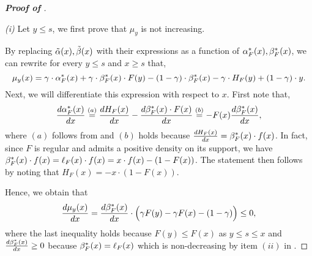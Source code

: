 \begin{proof}[\textbf{Proof of }]

\,

\noindent \textit{(i)} Let $y \leq s$, we first prove that $\mu_y$ is not increasing.

By replacing  $\tilde{\alpha}(x),\tilde{\beta}(x)$ with their expressions as a function of $\alpha^*_F(x),\beta^*_F(x)$, we can rewrite for every $y \leq s$  and $x \geq s$ that,
\begin{equation*}
\mu_{y}(x) = \gamma \cdot \alpha^*_F(x) + \gamma \cdot \beta^*_F(x) \cdot F(y) - (1-\gamma) \cdot \beta^*_F(x) - \gamma \cdot H_{F}(y) + (1-\gamma) \cdot y.
\end{equation*}
Next, we will differentiate this expression with respect to $x$. 
First note that,
\begin{equation*}
\frac{d \alpha^*_F(x)}{dx} \stackrel{(a)}{=} \frac{dH_{F}(x)}{dx} - \frac{d \beta^*_F(x) \cdot F(x)}{dx} \stackrel{(b)}{=} - F(x) \frac{d \beta^*_F(x)}{dx},
\end{equation*}
where $(a)$ follows from  and $(b)$ holds because $\frac{dH_{F}(x)}{dx} = \beta^*_F(x) \cdot f(x)$. In fact, since $F$ is regular and admits a positive density on its support, we have $\beta^*_F(x) \cdot f(x) = \ell_F(x) \cdot f(x) = x \cdot f(x) - (1 - F(x))$. The statement then follows by noting that $H_F(x) = -x\cdot (1-F(x))$.

Hence, we obtain that
\begin{equation*}
\frac{d \mu_{y}(x)}{dx} =  \frac{d \beta^*_F(x)}{dx} \cdot \Big ( \gamma F(y) - \gamma F(x) - (1-\gamma) \Big) \leq 0,
\end{equation*}
where the last inequality holds because $F(y) \leq F(x)$ as $y \leq s \leq x$ and $\frac{d \beta^*_F(x)}{dx} \geq 0$ because $\beta^*_F(x) = \ell_{F}(x)$ which is non-decreasing by item $(ii)$ in .


\end{proof}
